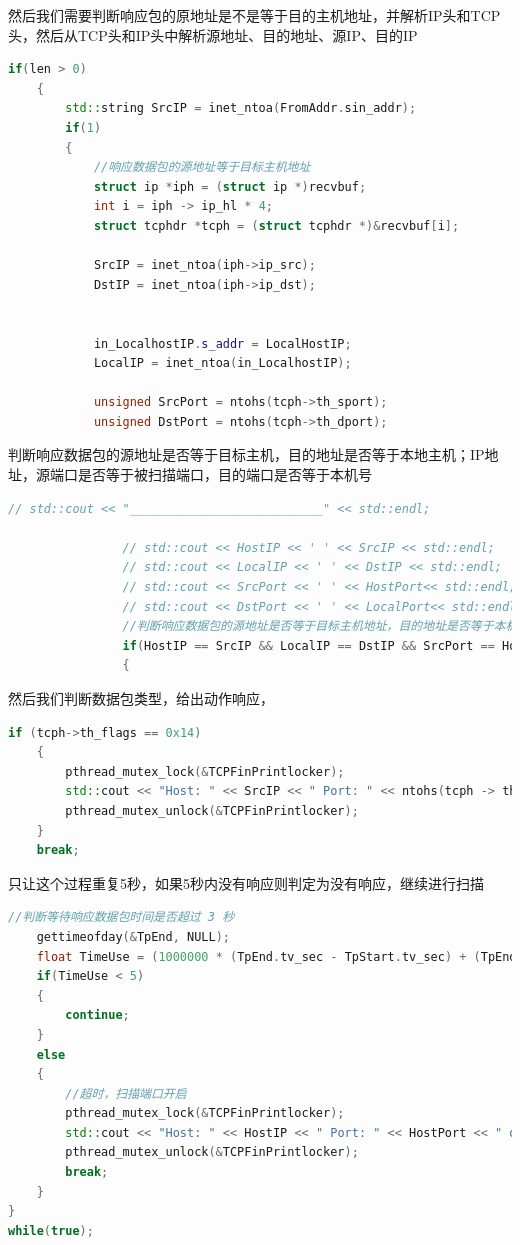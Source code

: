 \documentclass[UTF8,a4paper,10pt]{ctexart}
\begin{document}
然后我们需要判断响应包的原地址是不是等于目的主机地址，并解析IP头和TCP头，然后从TCP头和IP头中解析源地址、目的地址、源IP、目的IP
\begin{lstlisting}[language=C++]
    if(len > 0)
    {
        std::string SrcIP = inet_ntoa(FromAddr.sin_addr);
        if(1)
        {      
            //响应数据包的源地址等于目标主机地址 
            struct ip *iph = (struct ip *)recvbuf; 
            int i = iph -> ip_hl * 4; 
            struct tcphdr *tcph = (struct tcphdr *)&recvbuf[i]; 

            SrcIP = inet_ntoa(iph->ip_src);       
            DstIP = inet_ntoa(iph->ip_dst);       
            
            
            in_LocalhostIP.s_addr = LocalHostIP;
            LocalIP = inet_ntoa(in_LocalhostIP);  

            unsigned SrcPort = ntohs(tcph->th_sport);  
            unsigned DstPort = ntohs(tcph->th_dport); 
\end{lstlisting}
判断响应数据包的源地址是否等于目标主机，目的地址是否等于本地主机；IP地址，源端口是否等于被扫描端口，目的端口是否等于本机号
\begin{lstlisting}[language = C++]
    // std::cout << "___________________________" << std::endl;

				// std::cout << HostIP << ' ' << SrcIP << std::endl;
				// std::cout << LocalIP << ' ' << DstIP << std::endl;
				// std::cout << SrcPort << ' ' << HostPort<< std::endl;
				// std::cout << DstPort << ' ' << LocalPort<< std::endl;
                //判断响应数据包的源地址是否等于目标主机地址，目的地址是否等于本机 IP 地址，源端口是否等于被扫描端口，目的端口是否等于本机端口号
                if(HostIP == SrcIP && LocalIP == DstIP && SrcPort == HostPort && DstPort == LocalPort)
				{
\end{lstlisting}
然后我们判断数据包类型，给出动作响应，
\begin{lstlisting}[language = C++]
    if (tcph->th_flags == 0x14) 
    {  
        pthread_mutex_lock(&TCPFinPrintlocker);
        std::cout << "Host: " << SrcIP << " Port: " << ntohs(tcph -> th_sport) << " closed !" << std::endl;
        pthread_mutex_unlock(&TCPFinPrintlocker);
    }
    break;				
\end{lstlisting}
只让这个过程重复5秒，如果5秒内没有响应则判定为没有响应，继续进行扫描
\begin{lstlisting}[language = C++]
    //判断等待响应数据包时间是否超过 3 秒
    gettimeofday(&TpEnd, NULL);
    float TimeUse = (1000000 * (TpEnd.tv_sec - TpStart.tv_sec) + (TpEnd.tv_usec - TpStart.tv_usec)) / 1000000.0;
    if(TimeUse < 5)
    {
        continue;
    }
    else
    {
        //超时，扫描端口开启 
        pthread_mutex_lock(&TCPFinPrintlocker);
        std::cout << "Host: " << HostIP << " Port: " << HostPort << " open !" << std::endl;
        pthread_mutex_unlock(&TCPFinPrintlocker);
        break;
    }
}
while(true);
\end{lstlisting}
\end{document}

